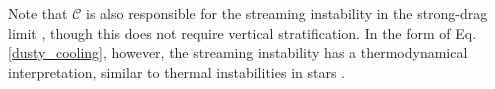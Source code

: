 Note that $\mathcal{C}$ is also responsible for the streaming
instability  in the strong-drag limit \citep{laibe14}, though this
does not require vertical stratification. In the form of
Eq. \ref{dusty_cooling}, however, the streaming instability has a
thermodynamical interpretation, similar to thermal instabilities in
stars \citep{latter06}.  

